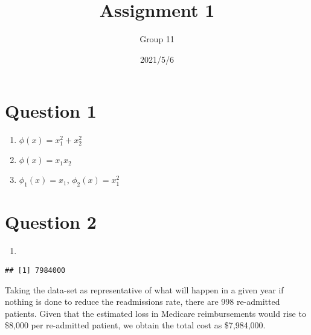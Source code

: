 \documentclass[
]{article}
\title{Assignment 1}
\author{Group 11}
\date{2021/5/6}
\newenvironment{Shaded}{\begin{snugshade}}{\end{snugshade}}
\newcommand{\AttributeTok}[1]{\textcolor[rgb]{0.77,0.63,0.00}{#1}}
\newcommand{\CommentTok}[1]{\textcolor[rgb]{0.56,0.35,0.01}{\textit{#1}}}
\newcommand{\ConstantTok}[1]{\textcolor[rgb]{0.00,0.00,0.00}{#1}}
\newcommand{\DecValTok}[1]{\textcolor[rgb]{0.00,0.00,0.81}{#1}}
\newcommand{\FunctionTok}[1]{\textcolor[rgb]{0.00,0.00,0.00}{#1}}
\newcommand{\NormalTok}[1]{#1}
\newcommand{\OtherTok}[1]{\textcolor[rgb]{0.56,0.35,0.01}{#1}}
\newcommand{\SpecialCharTok}[1]{\textcolor[rgb]{0.00,0.00,0.00}{#1}}
\newcommand{\StringTok}[1]{\textcolor[rgb]{0.31,0.60,0.02}{#1}}
\providecommand{\tightlist}{%
  \setlength{\itemsep}{0pt}\setlength{\parskip}{0pt}}
\begin{document}
\maketitle

\hypertarget{question-1}{%
\section{Question 1}\label{question-1}}

\begin{enumerate}
\def\labelenumi{(\alph{enumi})}
\tightlist
\item
  \(\phi(x)=x_1^2+x_2^2\) \newline
\item
  \(\phi(x)=x_1x_2\) \newline
\item
  \(\phi_1(x)=x_1\), \(\phi_2(x)=x_1^2\)
\end{enumerate}

\hypertarget{question-2}{%
\section{Question 2}\label{question-2}}

\begin{enumerate}
\def\labelenumi{(\alph{enumi})}
\tightlist
\item
\end{enumerate}

\begin{Shaded}
\end{Shaded}

\begin{verbatim}
## [1] 7984000
\end{verbatim}

Taking the data-set as representative of what will happen in a given
year if nothing is done to reduce the readmissions rate, there are 998
re-admitted patients. Given that the estimated loss in Medicare
reimbursements would rise to \$8,000 per re-admitted patient, we obtain
the total cost as \$7,984,000.
\end{document}
